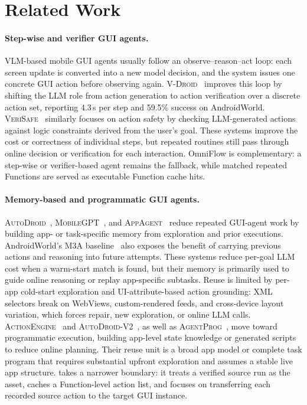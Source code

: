 
\section{Related Work}
\label{sec:related}

\paragraph{Step-wise and verifier GUI agents.}
VLM-based mobile GUI agents usually follow an observe--reason--act loop: each
screen update is converted into a new model decision, and the system issues one
concrete GUI action before observing again.  \textsc{V-Droid}~\cite{dai2025advancing}
improves this loop by shifting the LLM role from action generation to action
verification over a discrete action set, reporting 4.3\,s per step and 59.5\%
success on AndroidWorld.  \textsc{VeriSafe}~\cite{verisafe} similarly focuses
on action safety by checking LLM-generated actions against logic constraints
derived from the user's goal.  These systems improve the cost or correctness of
individual steps, but repeated routines still pass through online decision or
verification for each interaction.  OmniFlow is complementary: a step-wise or
verifier-based agent remains the fallback, while matched repeated Functions are
served as executable Function cache hits.

\paragraph{Memory-based and programmatic GUI agents.}
\textsc{AutoDroid}~\cite{wen2024autodroid},
\textsc{MobileGPT}~\cite{lee2024mobilegpt}, and
\textsc{AppAgent}~\cite{zhang2025appagent} reduce repeated GUI-agent work by
building app- or task-specific memory from exploration and prior executions.
AndroidWorld's M3A baseline~\cite{rawles2025androidworld} also exposes the
benefit of carrying previous actions and reasoning into future attempts.
These systems reduce per-goal LLM cost when a warm-start match is found, but
their memory is primarily used to guide online reasoning or replay app-specific
subtasks.  Reuse is limited by per-app cold-start exploration and
UI-attribute-based action grounding: XML selectors break on WebViews,
custom-rendered feeds, and cross-device layout variation, which forces repair,
new exploration, or online LLM calls.
\textsc{ActionEngine}~\cite{zhong2026actionengine} and
\textsc{AutoDroid-V2}~\cite{autodroid-v2}, as well as
\textsc{AgentProg}~\cite{tian2025agentprog}, move toward programmatic
execution, building app-level state knowledge or generated scripts to
reduce online planning.
Their reuse unit is a broad app model or complete task program that
requires substantial upfront exploration and assumes a stable live
app structure.
\sysname takes a narrower boundary: it treats a verified source run as the
asset, caches a Function-level action list, and focuses on transferring each
recorded source action to the target GUI instance.


